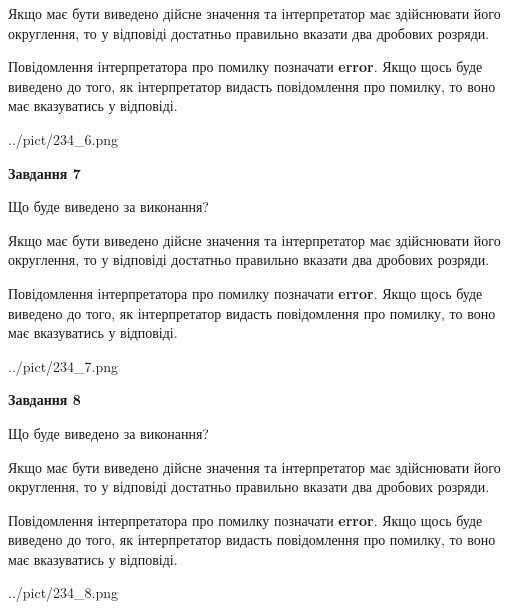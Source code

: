 \documentclass[12pt, ukrainian]{article}
\begin{document}
{\begin {Large}
Якщо має бути виведено дійсне значення та інтерпретатор має здійснювати його округлення, 
то у відповіді достатньо правильно вказати два дробових розряди.

Повідомлення інтерпретатора про помилку позначати \textbf{error}.
Якщо щось буде виведено до того, як інтерпретатор видасть повідомлення про помилку, 
то воно має вказуватись у відповіді. \par

\begin{center}
	{../pict/234_6.png}
\end{center}
\newpage

{\begin {center}\textbf{Завдання 7}\end {center}}\par
Що буде виведено за виконання? \par

Якщо має бути виведено дійсне значення та інтерпретатор має здійснювати його округлення, 
то у відповіді достатньо правильно вказати два дробових розряди.

Повідомлення інтерпретатора про помилку позначати \textbf{error}.
Якщо щось буде виведено до того, як інтерпретатор видасть повідомлення про помилку, 
то воно має вказуватись у відповіді. \par

\begin{center}
	{../pict/234_7.png}
\end{center}
\newpage

{\begin {center}\textbf{Завдання 8}\end {center}}\par
Що буде виведено за виконання? \par

Якщо має бути виведено дійсне значення та інтерпретатор має здійснювати його округлення, 
то у відповіді достатньо правильно вказати два дробових розряди.

Повідомлення інтерпретатора про помилку позначати \textbf{error}.
Якщо щось буде виведено до того, як інтерпретатор видасть повідомлення про помилку, 
то воно має вказуватись у відповіді. \par

\begin{center}
	{../pict/234_8.png}
\end{center}
\newpage


\end{Large}}
\end{document}
